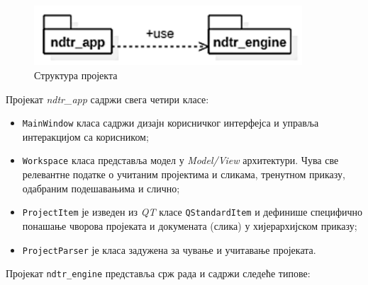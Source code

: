 \documentclass[11pt,a4paper,serbian,oneside]{book}
\begin{document}
\begin{figure}[H]
\begin{center}
\includegraphics[width=100mm]{images/struktura.png}
\end{center}
\caption{Структура пројекта}
\label{fig:struktura}
\end{figure}

Пројекат \textit{ndtr\_app} садржи свега четири класе:

\begin{itemize}
  \item \texttt{MainWindow} класа садржи дизајн корисничког интерфејса и управља интеракцијом са корисником;
  \item \texttt{Workspace} класа представља модел у \textit{Model/View} архитектури. Чува све релевантне податке о учитаним пројектима и сликама, тренутном приказу, одабраним подешавањима и слично;
  \item \texttt{ProjectItem} је изведен из \textit{QT} класе \texttt{QStandardItem} и дефинише специфично понашање чворова пројеката и докумената (слика) у хијерархијском приказу;
  \item \texttt{ProjectParser} је класа задужена за чување и учитавање пројеката.
\end{itemize}

Пројекат \texttt{ndtr\_engine} представља срж рада и садржи следеће типове:
\end{document}
